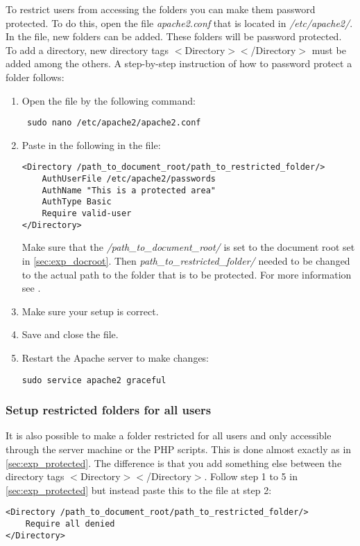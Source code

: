 To restrict users from accessing the folders you can make them password protected. To do this, open the file 
\textit{apache2.conf} that is located in \textit{/etc/apache2/}. In the file, new folders can be added. 
These folders will be password protected. To add a directory, new directory tags 
$<$Directory$><$/Directory$>$ must be added among the others.
A step-by-step instruction of how to password protect a folder follows:
\begin{enumerate}
	\item Open the file by the following command:
    \begin{verbatim} sudo nano /etc/apache2/apache2.conf\end{verbatim}
    \item Paste in the following in the file:
\begin{verbatim}
<Directory /path_to_document_root/path_to_restricted_folder/>
    AuthUserFile /etc/apache2/passwords
    AuthName "This is a protected area"
    AuthType Basic
   	Require valid-user
</Directory>
\end{verbatim}
Make sure that the \textit{/path\_to\_document\_root/} is set to the document root set in \ref{sec:exp_docroot}. Then \textit{path\_to\_restricted\_folder/} needed to be changed to the actual path to the folder that is to be protected. For more information see \cite{exp_apache2user}.
	\item Make sure your setup is correct.
    \item Save and close the file.
    \item Restart the Apache server to make changes:
    \begin{verbatim}sudo service apache2 graceful\end{verbatim}    
\end{enumerate}

\subsubsection{Setup restricted folders for all users}\label{sec:exp_restricted}
It is also possible to make a folder restricted for all users and only accessible through the server machine or the PHP scripts. This is done almost exactly as in \ref{sec:exp_protected}. The difference is that you add something else between the directory tags $<$Directory$><$/Directory$>$. Follow step 1 to 5 in \ref{sec:exp_protected} but instead paste this to the file at step 2:
\begin{verbatim}
<Directory /path_to_document_root/path_to_restricted_folder/>
    Require all denied
</Directory>
\end{verbatim}


